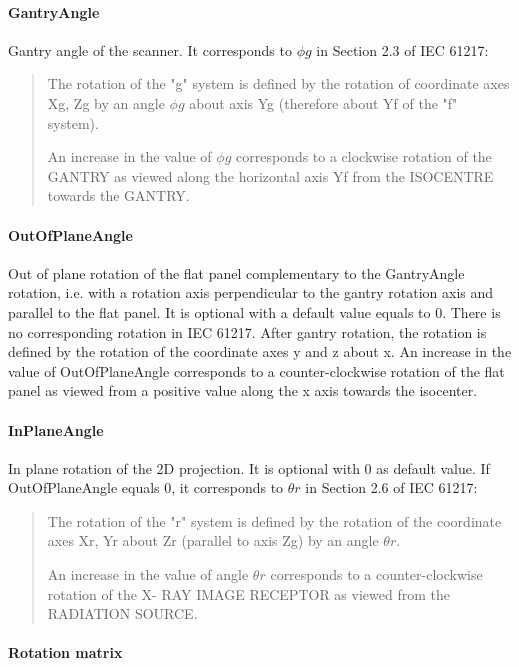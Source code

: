 \documentclass{article}
\newcommand{\biec}{\begin{quote}\begin{small}}
\newcommand{\eiec}{\end{small}\end{quote}}
\begin{document}
\paragraph{GantryAngle}

Gantry angle of the scanner. It corresponds to $\phi g$ in Section 2.3 of IEC 61217:

\biec
The rotation of the "g" system is defined by the rotation of coordinate axes Xg, Zg by an angle $\phi g$ about axis Yg (therefore about Yf of the "f" system).

An increase in the value of $\phi g$ corresponds to a clockwise rotation of the GANTRY as viewed along the horizontal axis Yf from the ISOCENTRE towards the GANTRY.
\eiec

\paragraph{OutOfPlaneAngle}

Out of plane rotation of the flat panel complementary to the GantryAngle rotation, i.e. with a rotation axis perpendicular to the gantry rotation axis and parallel to the flat panel. It is optional with a default value equals to 0. There is no corresponding rotation in IEC 61217. After gantry rotation, the rotation is defined by the rotation of the coordinate axes y and z about x. An increase in the value of OutOfPlaneAngle corresponds to a counter-clockwise rotation of the flat panel as viewed from a positive value along the x axis towards the isocenter.

\paragraph{InPlaneAngle} 

In plane rotation of the 2D projection. It is optional with 0 as default value. If OutOfPlaneAngle equals 0, it corresponds to $\theta r$ in Section 2.6 of IEC 61217:


\biec
The rotation of the "r" system is defined by the rotation of the coordinate axes Xr, Yr about Zr (parallel to axis Zg) by an angle $\theta r$.

An increase in the value of angle $\theta r$ corresponds to a counter-clockwise rotation of the X- RAY IMAGE RECEPTOR as viewed from the RADIATION SOURCE.
\eiec

\paragraph{Rotation matrix}
\end{document}
